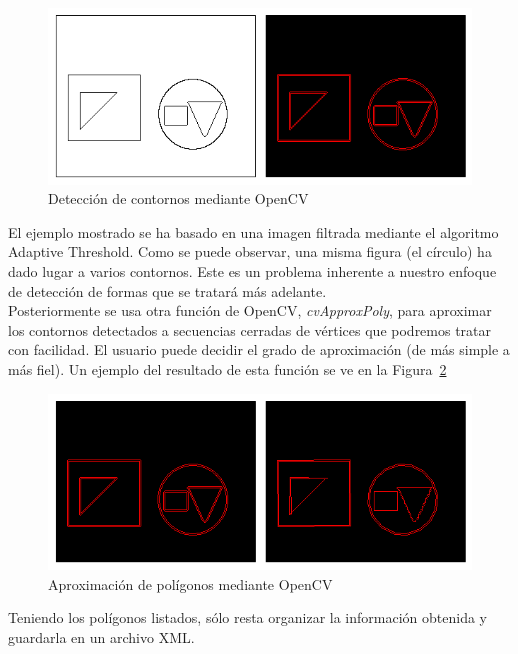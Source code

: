 {		\begin{figure}[!htbp]
		\centering
		\includegraphics[scale=0.47]{graphics/contourdetection.png}
		\caption{Detección de contornos mediante OpenCV}
		\label{fig:findcontours}
		\end{figure}
		
	El ejemplo mostrado se ha basado en una imagen filtrada mediante el algoritmo Adaptive Threshold. Como se puede observar, una misma figura (el círculo) ha dado lugar a varios contornos. Este es un problema inherente a nuestro enfoque de detección de formas que se tratará más adelante.\\
	
	Posteriormente se usa otra función de OpenCV, \emph{cvApproxPoly}, para aproximar los contornos detectados a secuencias cerradas de vértices que podremos tratar con facilidad. El usuario puede decidir el grado de aproximación (de más simple a más fiel). Un ejemplo del resultado de esta función se ve en la Figura~\ref{fig:aproxpoly}\\
	
		\begin{figure}[!htbp]
		\centering
		\includegraphics[scale=0.47]{graphics/aproxpoly.png}
		\caption{Aproximación de polígonos mediante OpenCV}
		\label{fig:aproxpoly}
		\end{figure}
				
	Teniendo los polígonos listados, sólo resta organizar la información obtenida y guardarla en un archivo XML.\\
	
}
